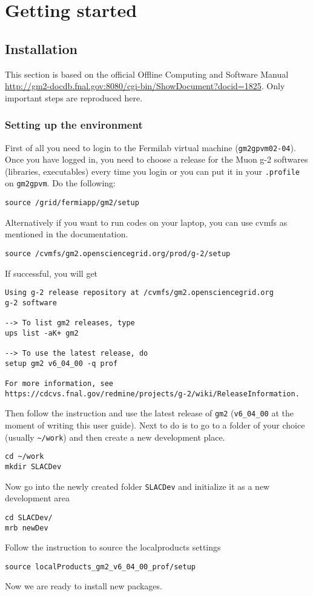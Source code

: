 \chapter{Getting started}
\label{chap:getstarted}

\section{Installation}

This section is based on the official Offline Computing and Software Manual \url{http://gm2-docdb.fnal.gov:8080/cgi-bin/ShowDocument?docid=1825}.
Only important steps are reproduced here.

\subsection{Setting up the environment}
\label{settinguptheenvironment}

First of all you need to login to the Fermilab virtual machine (\verb+gm2gpvm02-04+).
Once you have logged in, you need to choose a release for the Muon g-2 softwares (libraries, executables)
every time you login or you can put it in your \verb+.profile+ on \verb+gm2gpvm+. Do the following:
%
\begin{Verbatim}[frame=single]
source /grid/fermiapp/gm2/setup
\end{Verbatim}
%
Alternatively if you want to run codes on your laptop, you can use cvmfs as mentioned in the documentation.
%
\begin{Verbatim}[frame=single]
source /cvmfs/gm2.opensciencegrid.org/prod/g-2/setup
\end{Verbatim}
%
If successful, you will get
%
\begin{Verbatim}[frame=single]
Using g-2 release repository at /cvmfs/gm2.opensciencegrid.org
g-2 software

--> To list gm2 releases, type
ups list -aK+ gm2

--> To use the latest release, do
setup gm2 v6_04_00 -q prof

For more information, see
https://cdcvs.fnal.gov/redmine/projects/g-2/wiki/ReleaseInformation.
\end{Verbatim}
%
Then follow the instruction and use the latest release of \verb+gm2+ (\verb+v6_04_00+ at the moment of writing this user guide).
Next to do is to go to a folder of your choice (usually \verb+~/work+) and then create a new development place.
%
\begin{Verbatim}[frame=single]
cd ~/work
mkdir SLACDev
\end{Verbatim}
%
Now go into the newly created folder \verb+SLACDev+ and initialize it as a new development area
%
\begin{Verbatim}[frame=single]
cd SLACDev/
mrb newDev
\end{Verbatim}
%
Follow the instruction to source the localproducts settings
%
\begin{Verbatim}[frame=single]
source localProducts_gm2_v6_04_00_prof/setup
\end{Verbatim}
%
Now we are ready to install new packages.

